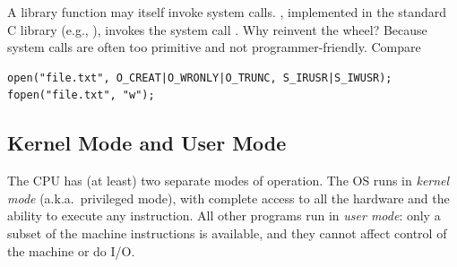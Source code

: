 A library function may itself invoke system calls. , implemented in the standard C library (e.g., ), invokes the system call . Why reinvent the wheel? Because system calls are often too primitive and not programmer-friendly. Compare
\begin{lstlisting}
open("file.txt", O_CREAT|O_WRONLY|O_TRUNC, S_IRUSR|S_IWUSR);
fopen("file.txt", "w");
\end{lstlisting}

\subsection{Kernel Mode and User Mode}

\begin{definition}
  The CPU has (at least) two separate modes of operation. The OS runs in \emph{kernel mode} (a.k.a.\ privileged mode), with complete access to all the hardware and the ability to execute any instruction. All other programs run in \emph{user mode}: only a subset of the machine instructions is available, and they cannot affect control of the machine or do I/O.
\end{definition}

